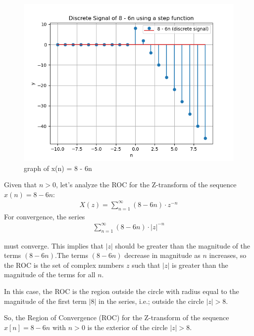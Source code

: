 \documentclass[journal,12pt,twocolumn]{IEEEtran}
\theoremstyle{remark}
\begin{document}
    \begin{figure}[h]
        \centering
        \includegraphics[width=1\linewidth]{Figs/Fig1.png}
        \caption{graph of x(n) = 8 - 6n}
        \label{8 - 6n dicrete function}
    \end{figure}

Given that \( n > 0 \), let's analyze the ROC for the Z-transform of the sequence $x(n) = 8 - 6n$:
    \begin{align}
    X(z) = \sum_{n=1}^{\infty} (8 - 6n) \cdot z^{-n}
    \end{align}
For convergence, the series 
    \begin{align}
    \sum_{n=1}^{\infty} (8 - 6n) \cdot |z|^{-n}
    \end{align}

\vspace{2mm}
must converge. This implies that \( |z| \) should be greater than the magnitude of the terms \( (8 - 6n) \).The terms \( (8 - 6n) \) decrease in magnitude as \( n \) increases, so the ROC is the set of complex numbers \( z \) such that \( |z| \) is greater than the magnitude of the terms for all \( n \).

\vspace{2mm}
In this case, the ROC is the region outside the circle with radius equal to the magnitude of the first term \( |8| \) in the series, i.e.; outside the circle \( |z| > 8 \).

\vspace{2mm}
So, the Region of Convergence (ROC) for the Z-transform of the sequence \( x[n] = 8 - 6n \) with \( n > 0 \) is the exterior of the circle \( |z| > 8 \).
\end{document}
